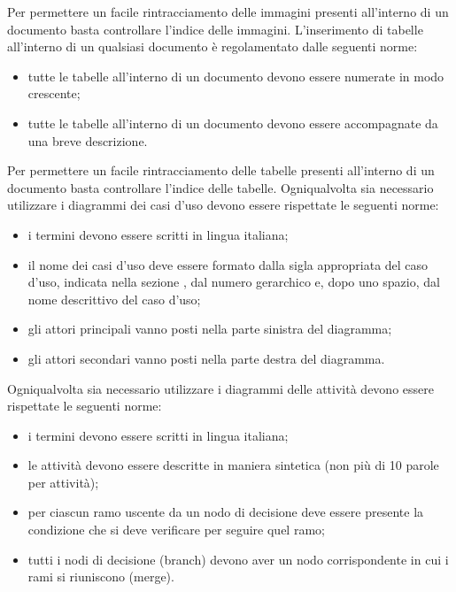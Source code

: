 					Per permettere un facile rintracciamento delle immagini presenti all’interno di un documento basta controllare l’indice delle immagini.
					L’inserimento di tabelle all’interno di un qualsiasi documento è regolamentato dalle seguenti norme:
					\begin{itemize}
						\item tutte le tabelle all’interno di un documento devono essere numerate in modo crescente;
						\item tutte le tabelle all’interno di un documento devono essere accompagnate da una breve descrizione.
					\end{itemize}
					Per permettere un facile rintracciamento delle tabelle presenti all’interno di un documento basta controllare l’indice delle tabelle.
				 \label{sec:UML}
					Ogniqualvolta sia necessario utilizzare i diagrammi dei casi d'uso devono essere rispettate le seguenti norme:
					\begin{itemize}
					\item i termini devono essere scritti in lingua italiana;
					\item il nome dei casi d'uso deve essere formato dalla sigla appropriata del caso d'uso, indicata nella sezione , dal numero gerarchico e, dopo uno spazio, dal nome descrittivo del caso d'uso;
					\item gli attori principali vanno posti nella parte sinistra del diagramma;
					\item gli attori secondari vanno posti nella parte destra del diagramma.
					\end{itemize}
					Ogniqualvolta sia necessario utilizzare i diagrammi delle attività devono essere rispettate le seguenti norme:
					\begin{itemize}
					\item i termini devono essere scritti in lingua italiana;
					\item le attività devono essere descritte in maniera sintetica (non più di 10 parole per attività);
					\item per ciascun ramo uscente da un nodo di decisione deve essere presente la condizione che si deve verificare per seguire quel ramo;
					\item tutti i nodi di decisione (branch) devono aver un nodo corrispondente in cui i rami si riuniscono (merge).
					\end{itemize}
